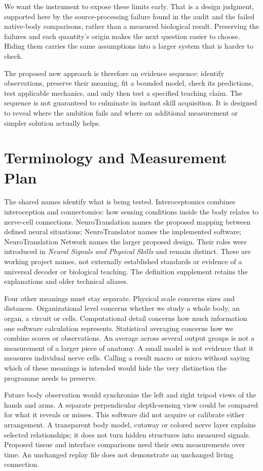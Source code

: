 We want the instrument to expose these limits early. That is a design judgment, supported here by the source-processing failure found in the audit and the failed native-body comparisons, rather than a measured biological result. Preserving the failures and each quantity's origin makes the next question easier to choose. Hiding them carries the same assumptions into a larger system that is harder to check.

The proposed new approach is therefore an evidence sequence: identify observations, preserve their meaning, fit a bounded model, check its predictions, test applicable mechanics, and only then test a specified teaching claim. The sequence is not guaranteed to culminate in instant skill acquisition. It is designed to reveal where the ambition fails and where an additional measurement or simpler solution actually helps.



\section{Terminology and Measurement Plan}

The shared names identify what is being tested. Interoceptomics combines
interoception and connectomics: how sensing conditions inside the body relates
to nerve-cell connections. NeuroTranslation names the proposed mapping between
defined neural situations; NeuroTranslator names the implemented software;
NeuroTranslation Network names the larger proposed design. Their roles were
introduced in \emph{Neural Signals and Physical Skills} and remain distinct.
These are working project names, not externally established standards or
evidence of a universal decoder or biological teaching. The definition
supplement retains the explanations and older technical aliases.

Four other meanings must stay separate. Physical scale concerns sizes and distances. Organizational level concerns whether we study a whole body, an organ, a circuit or cells. Computational detail concerns how much information one software calculation represents. Statistical averaging concerns how we combine scores or observations. An average across several output groups is not a measurement of a larger piece of anatomy. A small model is not evidence that it measures individual nerve cells. Calling a result macro or micro without saying which of these meanings is intended would hide the very distinction the programme needs to preserve.

Future body observation would synchronize the left and right tripod views of the hands and arms. A separate perpendicular depth-sensing view could be compared for what it reveals or misses. This software did not acquire or calibrate either arrangement. A transparent body model, cutaway or colored nerve layer explains selected relationships; it does not turn hidden structures into measured signals. Proposed tissue and interface comparisons need their own measurements over time. An unchanged replay file does not demonstrate an unchanged living connection.

